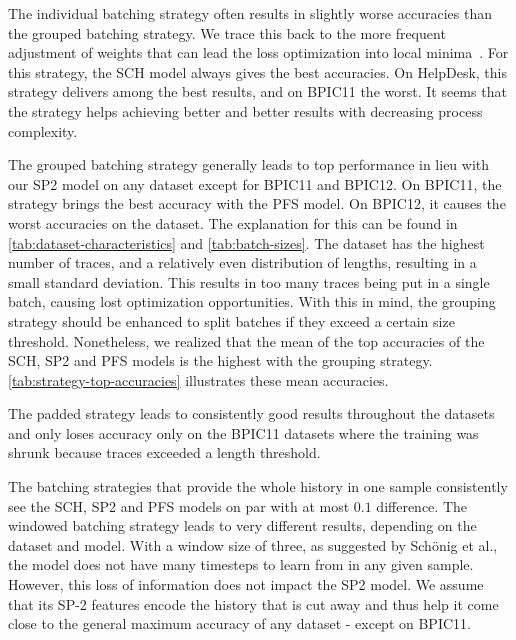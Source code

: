 The individual batching strategy often results in slightly worse accuracies than the grouped batching strategy. We trace this back to the more frequent adjustment of weights that can lead the loss optimization into local minima~\cite{keskar2016large}. For this strategy, the SCH model always gives the best accuracies. On HelpDesk, this strategy delivers among the best results, and on BPIC11 the worst. It seems that the strategy helps achieving better and better results with decreasing process complexity.

The grouped batching strategy generally leads to top performance in lieu with our SP2 model on any dataset except for BPIC11 and BPIC12. On BPIC11, the strategy brings the best accuracy with the PFS model. On BPIC12, it causes the worst accuracies on the dataset. The explanation for this can be found in \autoref{tab:dataset-characteristics} and \autoref{tab:batch-sizes}. The dataset has the highest number of traces, and a relatively even distribution of lengths, resulting in a small standard deviation. This results in too many traces being put in a single batch, causing lost optimization opportunities. With this in mind, the grouping strategy should be enhanced to split batches if they exceed a certain size threshold. Nonetheless, we realized that the mean of the top accuracies of the SCH, SP2 and PFS models is the highest with the grouping strategy. \autoref{tab:strategy-top-accuracies} illustrates these mean accuracies.

The padded strategy leads to consistently good results throughout the datasets and only loses accuracy only on the BPIC11 datasets where the training was shrunk because traces exceeded a length threshold.

The batching strategies that provide the whole history in one sample consistently see the SCH, SP2 and PFS models on par with at most $0.1$ difference. The windowed batching strategy leads to very different results, depending on the dataset and model. With a window size of three, as suggested by Schönig et al., the model does not have many timesteps to learn from in any given sample. However, this loss of information does not impact the SP2 model. We assume that its SP-2 features encode the history that is cut away and thus help it come close to the general maximum accuracy of any dataset - except on BPIC11.

